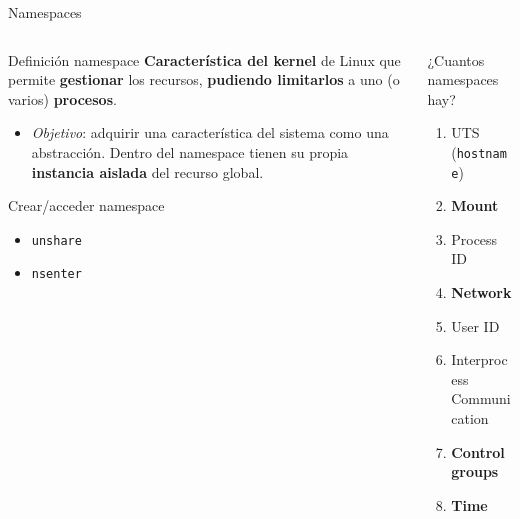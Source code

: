 \documentclass[aspectratio=169,xcolor=dvipsnames]{beamer}
\begin{document}
	\begin{frame}{Namespaces}
	
	    \begin{columns}
	    \begin{column}{0.6\textwidth}
	        \begin{block}{Definición namespace}
	           \textbf{Característica del kernel} de Linux que permite \textbf{gestionar} los recursos, \textbf{pudiendo limitarlos} a uno (o varios) \textbf{procesos}.
	           
	           \begin{itemize}
	               \item \textit{Objetivo}: adquirir una característica del sistema como una abstracción. Dentro del namespace tienen su propia \textbf{instancia aislada} del recurso global.
	           \end{itemize}
	        \end{block}
	        
	        \begin{alertblock}{Crear/acceder namespace}
	            \begin{itemize}
	                \item \texttt{unshare}
	                \item \texttt{nsenter}
	            \end{itemize}
	        \end{alertblock}
	    \end{column}
	    
	    \begin{column}{0.4\textwidth}
	        \begin{exampleblock}{¿Cuantos namespaces hay?}
		    \begin{enumerate}
		        \item UTS (\texttt{hostname})
		        \item \textbf{Mount}
		        \item Process ID
		        \item \textbf{Network}
		        \item User ID
		        \item Interprocess Communication
		        \item \textbf{Control groups}
		        \item \textbf{Time}
		    \end{enumerate}
		\end{exampleblock}
	    \end{column}
	    \end{columns}
	\end{frame}
\end{document}
